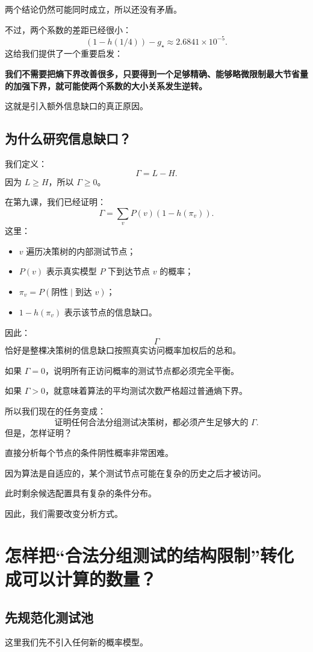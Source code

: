 \documentclass[UTF8,11pt]{ctexart}
\begin{document}
两个结论仍然可能同时成立，所以还没有矛盾。

不过，两个系数的差距已经很小：
\[(1-h(1/4))-g_\star\approx2.6841\times10^{-5}.\]
这给我们提供了一个重要启发：

\textbf{我们不需要把熵下界改善很多，只要得到一个足够精确、能够略微限制最大节省量的加强下界，就可能使两个系数的大小关系发生逆转。}

这就是引入额外信息缺口的真正原因。

\subsection{为什么研究信息缺口？}
我们定义：
\begin{equation}\boxed{\Gamma=L-H.}\tag{13}\end{equation}
因为 $L\ge H$，所以 $\Gamma\ge0$。

在第九课，我们已经证明：
\begin{equation}\boxed{\Gamma=\sum_vP(v)(1-h(\pi_v)).}\tag{14}\end{equation}
这里：
\begin{itemize}
\item $v$ 遍历决策树的内部测试节点；
\item $P(v)$ 表示真实模型 $P$ 下到达节点 $v$ 的概率；
\item $\pi_v=P(\text{阴性}\mid\text{到达 }v)$；
\item $1-h(\pi_v)$ 表示该节点的信息缺口。
\end{itemize}
因此：
\[\Gamma\]
恰好是整棵决策树的信息缺口按照真实访问概率加权后的总和。

如果 $\Gamma=0$，说明所有正访问概率的测试节点都必须完全平衡。

如果 $\Gamma>0$，就意味着算法的平均测试次数严格超过普通熵下界。

所以我们现在的任务变成：
\[\boxed{\text{证明任何合法分组测试决策树，都必须产生足够大的 }\Gamma.}\]
但是，怎样证明？

直接分析每个节点的条件阴性概率非常困难。

因为算法是自适应的，某个测试节点可能在复杂的历史之后才被访问。

此时剩余候选配置具有复杂的条件分布。

因此，我们需要改变分析方式。

\section{怎样把“合法分组测试的结构限制”转化成可以计算的数量？}
\subsection{先规范化测试池}
这里我们先不引入任何新的概率模型。
\end{document}
